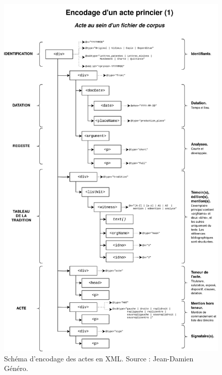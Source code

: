 \begin{figure}[H]
    \centering
    \includegraphics[scale=0.18]{img/encodage_actes_corpus.jpg}
    \caption{Schéma d'encodage des actes en XML. Source : Jean-Damien Généro.}
    \label{fig:encodage}
\end{figure}
\newpage 

